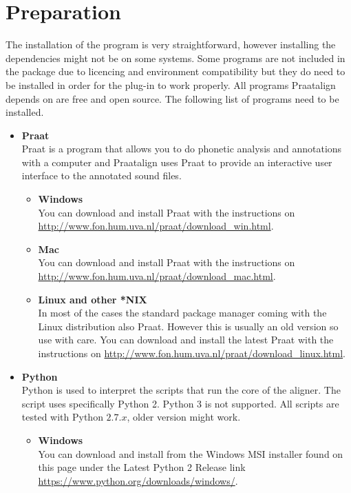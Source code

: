 \section{Preparation}
The installation of the program is very straightforward, however installing the
dependencies might not be on some systems.
Some programs are not included in the package due to licencing and environment
compatibility but they do need to be installed in order for the plug-in to work
properly. All programs Praatalign depends on are free and open source. The
following list of programs need to be installed.
\begin{itemize}
	\item \textbf{Praat}\\
		Praat is a program that allows you to do phonetic analysis and annotations
		with a computer and Praatalign uses Praat to provide an interactive user
		interface to the annotated sound files.
		\begin{itemize}
			\item \textbf{Windows}\\
				You can download and install Praat with the instructions on
				\url{http://www.fon.hum.uva.nl/praat/download_win.html}.
			\item \textbf{Mac}\\
				You can download and install Praat with the instructions on
				\url{http://www.fon.hum.uva.nl/praat/download_mac.html}.
			\item \textbf{Linux and other *NIX}\\
				In most of the cases the standard package manager coming with the
				Linux distribution also Praat. However this is usually an old version
				so use with care.  You can download and install the latest Praat with
				the instructions on
				\url{http://www.fon.hum.uva.nl/praat/download_linux.html}.
		\end{itemize}
	\item \textbf{Python}\\
		Python is used to interpret the scripts that run the core of the aligner.
		The script uses specifically Python 2. Python 3 is not supported. All
		scripts are tested with Python $2.7.x$, older version might work.
		\begin{itemize}
			\item \textbf{Windows}\\
				You can download and install from the Windows MSI installer found on
				this page under the Latest Python 2 Release link
				\url{https://www.python.org/downloads/windows/}.

\end{itemize}
\end{itemize}

